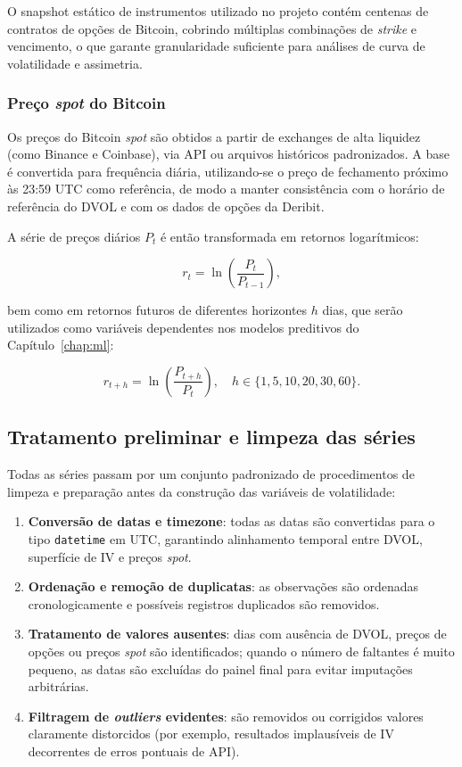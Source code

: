 O snapshot estático de instrumentos utilizado no projeto contém centenas de
contratos de opções de Bitcoin, cobrindo múltiplas combinações de \textit{strike} e
vencimento, o que garante granularidade suficiente para análises de curva de
volatilidade e assimetria.

\subsubsection*{Preço \textit{spot} do Bitcoin}

Os preços do Bitcoin \textit{spot} são obtidos a partir de exchanges de alta liquidez
(como Binance e Coinbase), via API ou arquivos históricos padronizados. A base é
convertida para frequência diária, utilizando-se o preço de fechamento próximo
às 23:59 UTC como referência, de modo a manter consistência com o horário de
referência do DVOL e com os dados de opções da Deribit.

A série de preços diários $P_t$ é então transformada em retornos logarítmicos:

\[
r_t = \ln\left(\frac{P_t}{P_{t-1}}\right),
\]

bem como em retornos futuros de diferentes horizontes $h$ dias, que serão
utilizados como variáveis dependentes nos modelos preditivos do Capítulo~\ref{chap:ml}:

\[
r_{t+h} = \ln\left(\frac{P_{t+h}}{P_t}\right),
\quad h \in \{1, 5, 10, 20, 30, 60\}.
\]

\subsection{Tratamento preliminar e limpeza das séries}

Todas as séries passam por um conjunto padronizado de procedimentos de limpeza
e preparação antes da construção das variáveis de volatilidade:

\begin{enumerate}
    \item \textbf{Conversão de datas e timezone}: todas as datas são convertidas
    para o tipo \texttt{datetime} em UTC, garantindo alinhamento temporal
    entre DVOL, superfície de IV e preços \textit{spot}.
    \item \textbf{Ordenação e remoção de duplicatas}: as observações são ordenadas
    cronologicamente e possíveis registros duplicados são removidos.
    \item \textbf{Tratamento de valores ausentes}: dias com ausência de DVOL,
    preços de opções ou preços \textit{spot} são identificados; quando o número
    de faltantes é muito pequeno, as datas são excluídas do painel final para
    evitar imputações arbitrárias.
    \item \textbf{Filtragem de \textit{outliers} evidentes}: são removidos ou
    corrigidos valores claramente distorcidos (por exemplo, resultados implausíveis
    de IV decorrentes de erros pontuais de API).
\end{enumerate}

